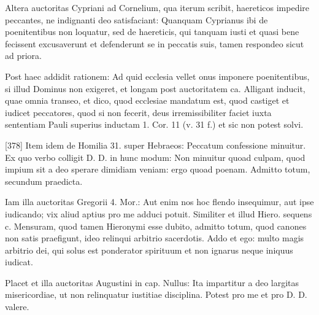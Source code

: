 Altera auctoritas Cypriani ad Cornelium, qua iterum scribit, haereticos impedire peccantes, ne indignanti deo satisfaciant: Quanquam Cyprianus ibi de poenitentibus non loquatur, sed de haereticis, qui tanquam iusti et quasi bene fecissent excusaverunt et defenderunt se in peccatis suis, tamen respondeo sicut ad priora.

Post haec addidit rationem: Ad quid ecclesia vellet onus imponere poenitentibus, si illud Dominus non exigeret, et longam post auctoritatem ca. Alligant inducit, quae omnia transeo, et dico, quod ecclesiae mandatum est, quod castiget et iudicet peccatores, quod si non fecerit, deus irremissibiliter faciet iuxta sententiam Pauli superius inductam 1. Cor. 11 (v. 31 f.) et sic non potest solvi.

[378] Item idem de Homilia 31. super Hebraeos: Peccatum confessione minuitur. Ex quo verbo colligit D. D. in hunc modum: Non minuitur quoad culpam, quod impium sit a deo sperare dimidiam veniam: ergo quoad poenam. Admitto totum, secundum praedicta.

Iam illa auctoritas Gregorii 4. Mor.: Aut enim nos hoc flendo insequimur, aut ipse iudicando; vix aliud aptius pro me adduci potuit. Similiter et illud Hiero. sequens c. Mensuram, quod tamen Hieronymi esse dubito, admitto totum, quod canones non satis praefigunt, ideo relinqui arbitrio sacerdotis. Addo et ego: multo magis arbitrio dei, qui solus est ponderator spirituum et non ignarus neque iniquus iudicat.

Placet et illa auctoritas Augustini in cap. Nullus: Ita impartitur a deo largitas misericordiae, ut non relinquatur iustitiae disciplina. Potest pro me et pro D. D. valere.

